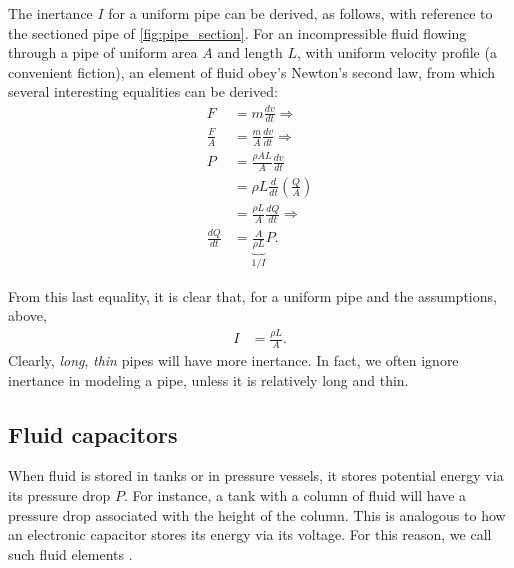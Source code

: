 \documentclass[dynamic_systems.tex]{subfiles}
\begin{document}
The inertance $I$ for a uniform pipe can be derived, as follows, with reference to the sectioned pipe of \cref{fig:pipe_section}.
For an incompressible fluid flowing through a pipe of uniform area $A$ and length $L$, with uniform velocity profile (a convenient fiction), an element of fluid obey's Newton's second law, from which several interesting equalities can be derived:
\tags{}
\begin{align*}
	F &= m \frac{d v}{d t} \Rightarrow \\
	\frac{F}{A} &= \frac{m}{A} \frac{d v}{d t} \Rightarrow \\
	P &= \frac{\rho A L}{A} \frac{d v}{d t} \\
	&= \rho L \frac{d}{d t} \left(\frac{Q}{A}\right) \\
	&= \frac{\rho L}{A} \frac{d Q}{d t} \Rightarrow \\
	\frac{d Q}{d t} &= \underbrace{\frac{A}{\rho L}}_{1/I} P.
\end{align*}

From this last equality, it is clear that, for a uniform pipe and the assumptions, above,
\begin{align}
	I &= \frac{\rho L}{A}.
\end{align}
Clearly, \emph{long}, \emph{thin} pipes will have more inertance.
In fact, we often ignore inertance in modeling a pipe, unless it is relatively long and thin.
\tags{}

\subsection{Fluid capacitors}

When fluid is stored in tanks or in pressure vessels, it stores potential energy via its pressure drop $P$.
For instance, a tank with a column of fluid will have a pressure drop associated with the height of the column.
This is analogous to how an electronic capacitor stores its energy via its voltage.
For this reason, we call such fluid elements .
\tags{}
\end{document}
